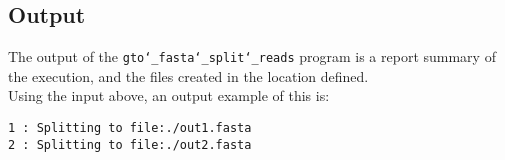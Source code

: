 \subsection*{Output}
The output of the \texttt{gto\char`_fasta\char`_split\char`_reads} program is a report summary of the execution, and the files created in the location defined.\\ 
Using the input above, an output example of this is:
\begin{lstlisting}
1 : Splitting to file:./out1.fasta
2 : Splitting to file:./out2.fasta
\end{lstlisting}
